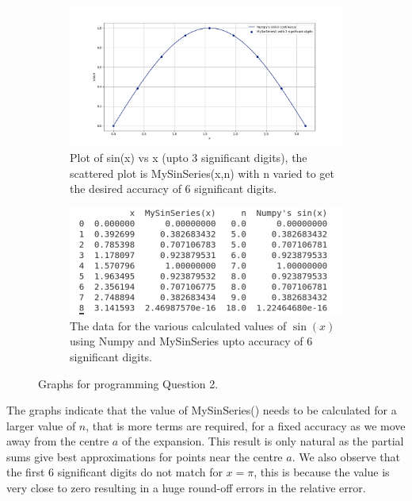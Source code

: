 \documentclass[12pt]{article}
\begin{document}
\begin{figure}[H]
	\centering
\begin{subfigure}[b]{\textwidth}
	\centering
	\includegraphics[width=0.9\linewidth]{graph3}
	\caption{ \centering \small Plot of sin(x) vs x (upto 3 significant digits), the scattered plot is MySinSeries(x,n) with n varied to get the desired accuracy of 6 significant digits.}
	\label{fig:graph3}
\end{subfigure}
\vskip 10mm
\begin{subfigure}[b]{0.6\textwidth}
	\centering
	\includegraphics[width=\linewidth]{output}
	\caption{ \small The data for the various calculated values of $ \sin (x) $ using Numpy and MySinSeries upto accuracy of 6 significant digits.}
	\label{fig:data}

\end{subfigure}
	\caption{ \small Graphs for programming Question 2.}
	\label{fig:fig3}
\end{figure}
\noindent
The graphs indicate that the value of MySinSeries() needs to be calculated for a larger value of $n$, that is more terms are required, for a fixed accuracy as we move away from the centre $a$ of the expansion.
This result is only natural as the partial sums give best approximations for points near the centre $a$. We also observe that the first 6 significant digits do not match for $x = \pi $, this is because the value is very close to zero resulting in a huge round-off errors in the relative error.   
\end{document}
